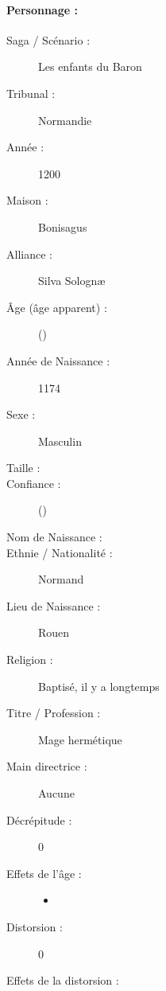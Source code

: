 \pagestyle{fancy}
\thispagestyle{plain}
{\Large \paragraph*{\Large Personnage :} \magusname}
\begin{multicols}{2}
\begin{description}
\item[Saga / Scénario :] Les enfants du Baron
\item[Tribunal :] Normandie
\item[Année :] 1200
\item[Maison :] Bonisagus
\item[Alliance :] Silva Solognæ
\item[Âge (âge apparent) :] \magusage{} (\magusapparentage)
\item[Année de Naissance :] 1174
\item[Sexe :] Masculin
\item[Taille :] \magussize
\item[Confiance :] \magusconfidencescore{} (\magusconfidencepts)
\columnbreak
\item[Nom de Naissance :] \magusbirthname
\item[Ethnie /  Nationalité :] Normand
\item[Lieu de Naissance :] Rouen
\item[Religion :] Baptisé, il y a longtemps
\item[Titre / Profession :] Mage hermétique
\item[Main directrice :] Aucune
\vspace{-1em}
\end{description}
\end{multicols}
\begin{multicols}{2}
\begin{description}
\item[Décrépitude :] 0
\item[Effets de l'âge :]\hspace{0pt}
\begin{itemize}
\item
\end{itemize}
\columnbreak
\item[Distorsion :] 0
\item[Effets de la distorsion :]\hspace{0pt}
\magusscarslong
\end{description}
\end{multicols}
